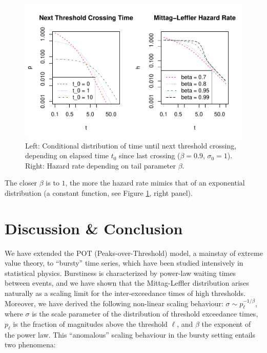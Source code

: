 \documentclass[]{elsarticle} %
\begin{document}
\begin{figure}
\includegraphics[width=\textwidth]{article_springer_files/figure-latex/hazard-1} \caption{\label{fig:hazard} Left: Conditional distribution of time until next threshold crossing, depending on elapsed time $t_0$ since last crossing ($\beta = 0.9$, $\sigma_0 = 1$). Right: Hazard rate depending on tail parameter $\beta$.}\label{fig:hazard}
\end{figure}

The closer \(\beta\) is to \(1\), the more the hazard rate mimics that
of an exponential distribution (a constant function, see Figure
\ref{fig:hazard}, right panel).

\hypertarget{discussion-conclusion}{%
\section{Discussion \& Conclusion}\label{discussion-conclusion}}

We have extended the POT (Peaks-over-Threshold) model, a mainstay of
extreme value theory, to ``bursty'' time series, which have been studied
intensively in statistical physics. Burstiness is characterized by
power-law waiting times between events, and we have shown that the
Mittag-Leffler distribution arises naturally as a scaling limit for the
inter-exceedance times of high thresholds. Moreover, we have derived the
following non-linear scaling behaviour:
\(\sigma \sim p_{\ell}^{-1/\beta}\), where \(\sigma\) is the scale
parameter of the distribution of threshold exceedance times,
\(p_{\ell}\) is the fraction of magnitudes above the threshold \(\ell\),
and \(\beta\) the exponent of the power law. This ``anomalous'' scaling
behaviour in the bursty setting entails two phenomena:
\end{document}
